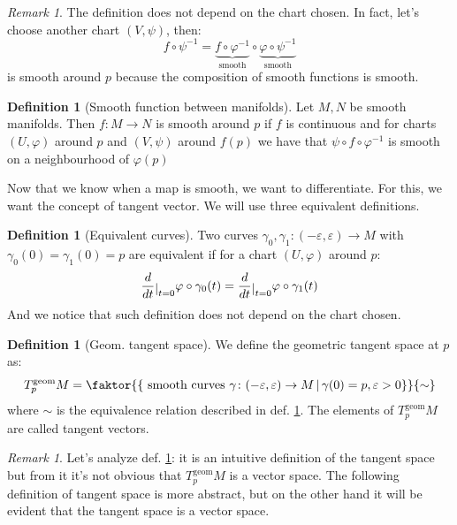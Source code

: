 \documentclass[a4paper,11pt,titlepage, article, oneside]{memoir}
\numberwithin{equation}{section}
\theoremstyle{definition}
\newtheorem{definition}[theorem]{Definition}
\theoremstyle{remark}
\newtheorem{remark}[theorem]{Remark}
\newcommand{\restrict}[2]{{#1}\raisebox{-.5ex}{$|$}_{#2}}
\newcommand{\diondi}[1]{\frac{d}{d{#1}}}
\newcommand{\tangentgeom}[1]{T_{#1}^{\text{geom}}}
\begin{document}
\begin{remarkbox}
\begin{remark}
The definition does not depend on the chart chosen. In fact, let's choose another chart $(V, \psi)$, then:
$$f \circ \psi^{-1} = \underbrace{f \circ \varphi^{-1}}_{\text{smooth}} \circ \underbrace{\varphi \circ \psi^{-1}}_{\text{smooth}}$$
is smooth around $p$ because the composition of smooth functions is smooth.
\end{remark}
\end{remarkbox}

\begin{definition}[Smooth function between manifolds]
Let $M, N$ be smooth manifolds. Then $f \colon M \rightarrow N$ is smooth around $p$ if $f$ is continuous and for charts $(U, \varphi)$ around $p$ and $(V, \psi)$ around $f(p)$ we have that $\psi \circ f \circ \varphi^{-1}$ is smooth on a neighbourhood of $\varphi(p)$
\end{definition}

Now that we know when a map is smooth, we want to differentiate. For this, we want the concept of tangent vector. We will use three equivalent definitions.

\begin{definition}[Equivalent curves] \label{equivcurves}
Two curves $\gamma_0, \gamma_1 \colon (-\varepsilon, \varepsilon) \rightarrow M$ with $\gamma_0(0)=\gamma_1(0)=p$ are equivalent if for a chart $(U, \varphi)$ around $p$:
\begin{equation*}
\restrict{\diondi{t}}{t=0} \varphi \circ \gamma_0(t) = \restrict{\diondi{t}}{t=0} \varphi \circ \gamma_1(t)
\end{equation*}
And we notice that such definition does not depend on the chart chosen.
\end{definition}

\begin{definition}[Geom. tangent space] \label{geomtangent}
We define the geometric tangent space at $p$ as:
\begin{equation}
\tangentgeom{p} M = \faktor{ 
\left \{ \text{ smooth curves } \gamma \colon (-\varepsilon, \varepsilon) \rightarrow M \, | \, \gamma(0) = p, \varepsilon > 0 \right \}}
{\sim}
\end{equation}
where $\sim$ is the equivalence relation described in def. \ref{equivcurves}. The elements of $\tangentgeom{p} M$ are called tangent vectors.  
\end{definition}

\begin{remarkbox}\begin{remark}
Let's analyze def. \ref{geomtangent}: it is an intuitive definition of the tangent space but from it it's not obvious that $\tangentgeom{p} M$ is a vector space. The following definition of tangent space is more abstract, but on the other hand it will be evident that the tangent space is a vector space.
\end{remark}\end{remarkbox}
\end{document}
